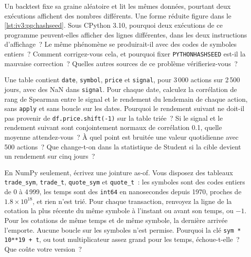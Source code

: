\begin{question}\label{iq:iv3:python-and-pandas:37}
Un backtest fixe sa graine aléatoire et lit les mêmes données, pourtant deux exécutions affichent des nombres différents. Une forme réduite figure dans le \cref{lst:iv3:pp:hashseed}. Sous CPython 3.10, pourquoi deux exécutions de ce programme peuvent-elles afficher des lignes différentes, dans les deux instructions d'affichage~? Le même phénomène se produirait-il avec des codes de symboles entiers~? Comment corrigez-vous cela, et pourquoi fixer \texttt{PYTHONHASHSEED} est-il la mauvaise correction~? Quelles autres sources de ce problème vérifieriez-vous~?
\label{lst:iv3:pp:hashseed}
\end{question}

\begin{question}\label{iq:iv3:python-and-pandas:38}
Une table contient \texttt{date}, \texttt{symbol}, \texttt{price} et \texttt{signal}, pour 3\,000 actions sur 2\,500 jours, avec des NaN dans \texttt{signal}. Pour chaque date, calculez la corrélation de rang de Spearman entre le signal et le rendement du lendemain de chaque action, sans \texttt{apply} et sans boucle sur les dates. Pourquoi le rendement suivant ne doit-il pas provenir de \texttt{df.price.shift(-1)} sur la table triée~? Si le signal et le rendement suivant sont conjointement normaux de corrélation 0.1, quelle moyenne attendez-vous~? À quel point est bruitée une valeur quotidienne avec 500 actions~? Que change-t-on dans la statistique de Student si la cible devient un rendement sur cinq jours~?
\end{question}

\begin{question}\label{iq:iv3:python-and-pandas:39}
En NumPy seulement, écrivez une jointure as-of. Vous disposez des tableaux \texttt{trade\_sym}, \texttt{trade\_t}, \texttt{quote\_sym} et \texttt{quote\_t}~: les symboles sont des codes entiers de 0 à 4\,999, les temps sont des \texttt{int64} en nanosecondes depuis 1970, proches de $1.8 \times 10^{18}$, et rien n'est trié. Pour chaque transaction, renvoyez la ligne de la cotation la plus récente du même symbole à l'instant ou avant son temps, ou $-1$. Pour les cotations de même temps et de même symbole, la dernière arrivée l'emporte. Aucune boucle sur les symboles n'est permise. Pourquoi la clé \texttt{sym * 10**19 + t}, ou tout multiplicateur assez grand pour les temps, échoue-t-elle~? Que coûte votre version~?
\end{question}

